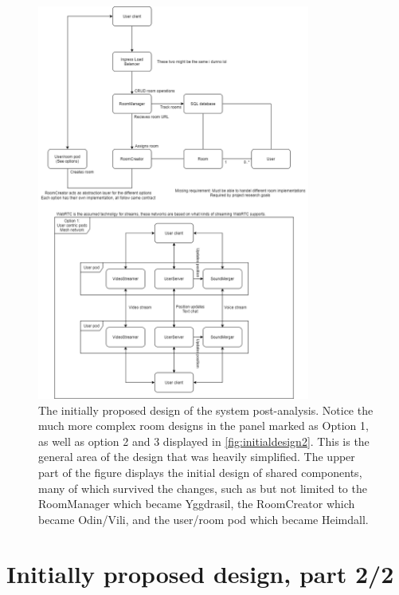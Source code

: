 \begin{figure}[H]
    \centering
    \includegraphics[width=0.8\textwidth]{Pictures/InitialDesignP1.png}
    \caption{The initially proposed design of the system post-analysis. Notice the much more complex room designs in the panel marked as Option 1, as well as option 2 and 3 displayed in \ref{fig:initialdesign2}. This is the general area of the design that was heavily simplified. The upper part of the figure displays the initial design of shared components, many of which survived the changes, such as but not limited to the RoomManager which became Yggdrasil, the RoomCreator which became Odin/Vili, and the user/room pod which became Heimdall.}
    \label{fig:initialdesign1}
\end{figure}

\chapter{Initially proposed design, part 2/2}

